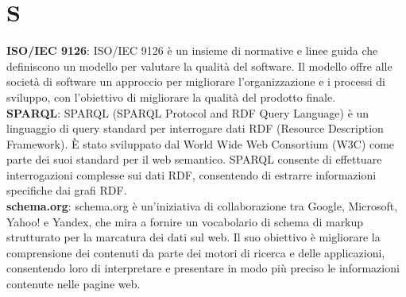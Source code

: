 \section{S}
\textbf{ISO/IEC 9126}: ISO/IEC 9126 è un insieme di normative e linee guida che definiscono un modello per valutare la qualità del software. Il modello offre alle società di software un approccio per migliorare l'organizzazione e i processi di sviluppo, con l'obiettivo di migliorare la qualità del prodotto finale.\\
\textbf{SPARQL}: SPARQL (SPARQL Protocol and RDF Query Language) è un linguaggio di query standard per interrogare dati RDF (Resource Description Framework). È stato sviluppato dal World Wide Web Consortium (W3C) come parte dei suoi standard per il web semantico. SPARQL consente di effettuare interrogazioni complesse sui dati RDF, consentendo di estrarre informazioni specifiche dai grafi RDF.\\
\textbf{schema.org}: schema.org è un'iniziativa di collaborazione tra Google, Microsoft, Yahoo! e Yandex, che mira a fornire un vocabolario di schema di markup strutturato per la marcatura dei dati sul web. Il suo obiettivo è migliorare la comprensione dei contenuti da parte dei motori di ricerca e delle applicazioni, consentendo loro di interpretare e presentare in modo più preciso le informazioni contenute nelle pagine web.